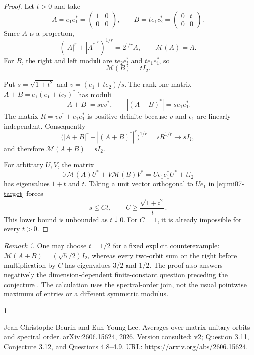 \documentclass[10pt,a4paper]{article}
\theoremstyle{remark}
\newtheorem{remark}[theorem]{Remark}
\newcommand{\maxmod}{\mathcal M}
\begin{document}
\begin{proof}
Let $t>0$ and take
\[
 A=e_1e_1^*=\begin{pmatrix}1&0\\0&0\end{pmatrix},\qquad
 B=te_1e_2^*=\begin{pmatrix}0&t\\0&0\end{pmatrix}.
\]
Since $A$ is a projection,
\[
 (|A|^r+|A^*|^r)^{1/r}=2^{1/r}A,
 \qquad\maxmod(A)=A.
\]
For $B$, the right and left moduli are $te_2e_2^*$ and $te_1e_1^*$, so
\[
 \maxmod(B)=tI_2.
\]

Put $s=\sqrt{1+t^2}$ and $v=(e_1+te_2)/s$. The rank-one matrix $A+B=e_1(e_1+te_2)^*$ has moduli
\[
 |A+B|=svv^*,\qquad |(A+B)^*|=se_1e_1^*.
\]
The matrix $R=vv^*+e_1e_1^*$ is positive definite because $v$ and $e_1$ are linearly independent. Consequently
\[
 \bigl(|A+B|^r+|(A+B)^*|^r\bigr)^{1/r}
 =sR^{1/r}\longrightarrow sI_2,
\]
and therefore $\maxmod(A+B)=sI_2$.

For arbitrary $U,V$, the matrix
\[
 U\maxmod(A)U^*+V\maxmod(B)V^*
 =Ue_1e_1^*U^*+tI_2
\]
has eigenvalues $1+t$ and $t$. Taking a unit vector orthogonal to $Ue_1$ in \eqref{eq:mi07-target} forces
\[
 s\leq Ct,\qquad C\geq\frac{\sqrt{1+t^2}}{t}.
\]
This lower bound is unbounded as $t\downarrow0$. For $C=1$, it is already impossible for every $t>0$.
\end{proof}

\begin{remark}
One may choose $t=1/2$ for a fixed explicit counterexample: $\maxmod(A+B)=(\sqrt5/2)I_2$, whereas every two-orbit sum on the right before multiplication by $C$ has eigenvalues $3/2$ and $1/2$. The proof also answers negatively the dimension-dependent finite-constant question preceding the conjecture \cite[Question 3.11]{BL2026}. The calculation uses the spectral-order join, not the usual pointwise maximum of entries or a different symmetric modulus.
\end{remark}

\begin{thebibliography}{1}

Jean-Christophe Bourin and Eun-Young Lee.
\newblock Averages over matrix unitary orbits and spectral order.
\newblock arXiv:2606.15624, 2026.
\newblock Version consulted: v2; Question 3.11, Conjecture 3.12, and Questions
  4.8--4.9.
\newblock URL: \url{https://arxiv.org/abs/2606.15624}.

\end{thebibliography}
\end{document}
